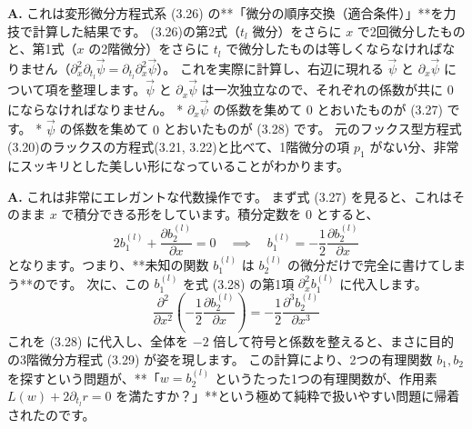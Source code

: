 \begin{Q}
\textbf{A.} これは変形微分方程式系 (3.26) の**「微分の順序交換（適合条件）」**を力技で計算した結果です。
(3.26)の第2式（$t_l$ 微分）をさらに $x$ で2回微分したものと、第1式（$x$ の2階微分）をさらに $t_l$ で微分したものは等しくならなければなりません（$\partial_x^2 \partial_{t_l} \vec{\psi} = \partial_{t_l} \partial_x^2 \vec{\psi}$）。
これを実際に計算し、右辺に現れる $\vec{\psi}$ と $\partial_x \vec{\psi}$ について項を整理します。$\vec{\psi}$ と $\partial_x \vec{\psi}$ は一次独立なので、それぞれの係数が共に $0$ にならなければなりません。
* $\partial_x \vec{\psi}$ の係数を集めて $0$ とおいたものが (3.27) です。
* $\vec{\psi}$ の係数を集めて $0$ とおいたものが (3.28) です。
元のフックス型方程式(3.20)のラックスの方程式(3.21, 3.22)と比べて、1階微分の項 $p_1$ がない分、非常にスッキリとした美しい形になっていることがわかります。
\end{Q}

\begin{Q}
\textbf{A.} これは非常にエレガントな代数操作です。
まず式 (3.27) を見ると、これはそのまま $x$ で積分できる形をしています。積分定数を $0$ とすると、
$$ 2b_1^{(l)} + \frac{\partial b_2^{(l)}}{\partial x} = 0 \quad \implies \quad b_1^{(l)} = -\frac{1}{2} \frac{\partial b_2^{(l)}}{\partial x} $$
となります。つまり、**未知の関数 $b_1^{(l)}$ は $b_2^{(l)}$ の微分だけで完全に書けてしまう**のです。
次に、この $b_1^{(l)}$ を式 (3.28) の第1項 $\partial_x^2 b_1^{(l)}$ に代入します。
$$ \frac{\partial^2}{\partial x^2} \left( -\frac{1}{2} \frac{\partial b_2^{(l)}}{\partial x} \right) = -\frac{1}{2} \frac{\partial^3 b_2^{(l)}}{\partial x^3} $$
これを (3.28) に代入し、全体を $-2$ 倍して符号と係数を整えると、まさに目的の3階微分方程式 (3.29) が姿を現します。
この計算により、2つの有理関数 $b_1, b_2$ を探すという問題が、**「$w = b_2^{(l)}$ というたった1つの有理関数が、作用素 $L(w) + 2\partial_{t_l}r = 0$ を満たすか？」**という極めて純粋で扱いやすい問題に帰着されたのです。
\end{Q}

